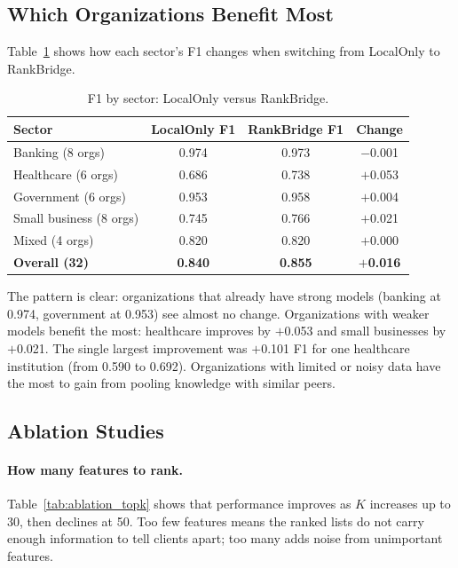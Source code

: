 \documentclass[information,article,submit,pdftex]{mdpi}
\begin{document}
\subsection{Which Organizations Benefit Most}

Table~\ref{tab:per_org} shows how each sector's F1 changes when switching from
LocalOnly to RankBridge.

\begin{table}[H]
\caption{F1 by sector: LocalOnly versus RankBridge.}\label{tab:per_org}
\begin{tabular}{lccc}
\toprule
\textbf{Sector} & \textbf{LocalOnly F1} & \textbf{RankBridge F1} &
  \textbf{Change} \\
\midrule
Banking (8 orgs)        & 0.974 & 0.973 & $-$0.001 \\
Healthcare (6 orgs)     & 0.686 & 0.738 & $+$0.053 \\
Government (6 orgs)     & 0.953 & 0.958 & $+$0.004 \\
Small business (8 orgs) & 0.745 & 0.766 & $+$0.021 \\
Mixed (4 orgs)          & 0.820 & 0.820 & $+$0.000 \\
\midrule
\textbf{Overall (32)}   & \textbf{0.840} & \textbf{0.855} & \textbf{$+$0.016} \\
\bottomrule
\end{tabular}
\end{table}

The pattern is clear: organizations that already have strong models (banking at
0.974, government at 0.953) see almost no change. Organizations with weaker
models benefit the most: healthcare improves by $+$0.053 and small businesses by
$+$0.021. The single largest improvement was $+$0.101 F1 for one healthcare
institution (from 0.590 to 0.692). Organizations with limited or noisy data have
the most to gain from pooling knowledge with similar peers.

\subsection{Ablation Studies}

\paragraph{How many features to rank.} Table~\ref{tab:ablation_topk} shows that
performance improves as $K$ increases up to 30, then declines at 50. Too few
features means the ranked lists do not carry enough information to tell clients
apart; too many adds noise from unimportant features.
\end{document}
